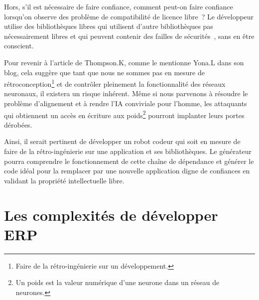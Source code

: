Hors, s'il est nécessaire de faire confiance, comment peut-on faire confiance lorsqu'on observe des problème de compatibilité de licence libre~\cite{pfeiffer2022license}\cite{8667977}? Le développeur utilise des bibliothèques libres qui utilisent d'autre bibliothèques pas nécessairement libres et qui peuvent contenir des failles de sécurités~\cite{10.1145/3133956.3134048}, sans en être conscient. 

Pour revenir à l'article de Thompson.K, comme le mentionne Yona.L dans son blog, cela suggère que tant que nous ne sommes pas en mesure de rétroconception\footnote{Faire de la rétro-ingénierie sur un développement.} et de contrôler pleinement la fonctionnalité des réseaux neuronaux, il existera un risque inhérent. Même si nous parvenons à résoudre le problème d'alignement et à rendre l'IA conviviale pour l'homme, les attaquants qui obtiennent un accès en écriture aux poids\footnote{Un poids est la valeur numérique d'une neurone dans un réseau de neurones.} pourront implanter leurs portes dérobées.~\cite{discussion_reflection_trusting_ia_2023}

Ainsi, il serait pertinent de développer un robot codeur qui soit en mesure de faire de la rétro-ingénierie sur une application et ses bibliothèques. Le générateur pourra comprendre le fonctionnement de cette chaîne de dépendance et générer le code idéal pour la remplacer par une nouvelle application digne de confiances en validant la propriété intellectuelle libre.

\section{Les complexités de développer ERP}


